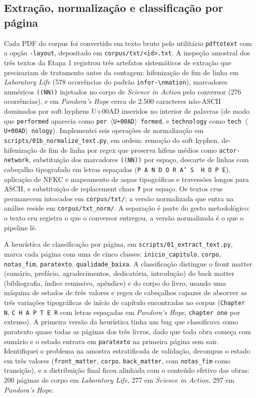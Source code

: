 \subsection{Extração, normalização e classificação por página}

Cada PDF do corpus foi convertido em texto bruto pelo utilitário \texttt{pdftotext} com a opção \texttt{-layout}, depositado em \texttt{corpus/txt/<id>.txt}. A inspeção amostral dos três textos da Etapa 1 registrou três artefatos sistemáticos de extração que precisariam de tratamento antes da contagem: hifenização de fim de linha em \emph{Laboratory Life} (578 ocorrências do padrão \texttt{infor-\textbackslash{}nmation}), marcadores numéricos \texttt{((NN))} injetados no corpo de \emph{Science in Action} pelo conversor (276 ocorrências), e em \emph{Pandora's Hope} cerca de 2.500 caracteres não-ASCII dominados por soft hyphens U+00AD inseridos no interior de palavras (de modo que \texttt{performed} aparecia como \texttt{per\,$\langle$U+00AD$\rangle$\,formed}, e \texttt{technology} como \texttt{tech\,$\langle$U+00AD$\rangle$\,nology}). Implementei seis operações de normalização em \texttt{scripts/01b\_normalize\_text.py}, em ordem: remoção do soft hyphen, de-hifenização de fim de linha por regex que preserva hifens médios como \texttt{actor-network}, substituição dos marcadores \texttt{((NN))} por espaço, descarte de linhas com cabeçalho tipografado em letras espaçadas (\texttt{P\ A\ N\ D\ O\ R\ A'\ S\ \ H\ O\ P\ E}), aplicação de NFKC e mapeamento de aspas tipográficas e travessões longos para ASCII, e substituição de replacement chars \texttt{\textbf{?}} por espaço. Os textos crus permanecem intocados em \texttt{corpus/txt/}; a versão normalizada que entra na análise reside em \texttt{corpus/txt\_norm/}. A separação é parte do gesto metodológico: o texto cru registra o que o conversor entregou, a versão normalizada é o que o pipeline lê.

A heurística de classificação por página, em \texttt{scripts/01\_extract\_text.py}, marca cada página com uma de cinco classes: \texttt{inicio\_capitulo}, \texttt{corpo}, \texttt{notas\_fim}, \texttt{paratexto}, \texttt{qualidade\_baixa}. A classificação distingue o front matter (sumário, prefácio, agradecimentos, dedicatória, introdução) do back matter (bibliografia, índice remissivo, apêndice) e do corpo do livro, usando uma máquina de estados de três valores e regex de cabeçalhos capazes de absorver as três variações tipográficas de início de capítulo encontradas no corpus (\texttt{Chapter N}, \texttt{C\ H\ A\ P\ T\ E\ R} com letras espaçadas em \emph{Pandora's Hope}, \texttt{chapter one} por extenso). A primeira versão da heurística tinha um bug que classificava como paratexto quase todas as páginas dos três livros, dado que toda obra começa com sumário e o estado entrava em \texttt{paratexto} na primeira página sem sair. Identifiquei o problema na amostra estratificada de validação, decompus o estado em três valores (\texttt{front\_matter}, \texttt{corpo}, \texttt{back\_matter}, com \texttt{notas\_fim} como transição), e a distribuição final ficou alinhada com o conteúdo efetivo das obras: 200 páginas de corpo em \emph{Laboratory Life}, 277 em \emph{Science in Action}, 297 em \emph{Pandora's Hope}.

